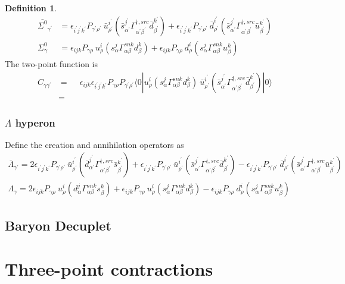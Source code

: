 \documentclass[prd,12pt,superscriptaddress,tightenlines,nofootinbib]{revtex4}
\def\a{{\alpha}}
\def\b{{\beta}}
\def\g{{\gamma}}
\def\G{{\Gamma}}
\def\ip{{i^\prime}}
\def\jp{{j^\prime}}
\def\kp{{k^\prime}}
\def\ap{{\alpha^\prime}}
\def\bp{{\beta^\prime}}
\def\gp{{\gamma^\prime}}
\def\rp{{\rho^\prime}}
\theoremstyle{plain}
\theoremstyle{definition}
\newtheorem{defn}[thm]{Definition}
\theoremstyle{remark}
\begin{document}
\begin{defn}
\begin{align}
	\bar{\Sigma^0}_{\gp} &= \epsilon_{\ip\jp\kp} P_{\gp\rp}\ \bar{u}^\ip_\rp (\bar{s}^{\jp}_{\ap} \G^{\dagger,src}_{\ap\bp} \bar{d}^\kp_\bp ) 
	+ \epsilon_{\ip\jp\kp} P_{\gp\rp}\ \bar{d}^\ip_\rp (\bar{s}^{\jp}_{\ap} \G^{\dagger,src}_{\ap\bp} \bar{u}^\kp_\bp ) \\
	\Sigma^0_{\g} &= \epsilon_{ijk} P_{\g\rho}\ u^i_\rho (s^j_\a \G^{snk}_{\a\b} d^k_\b ) +  
	\epsilon_{ijk} P_{\g\rho}\ d^i_\rho (s^j_\a \G^{snk}_{\a\b} u^k_\b )
	\end{align}
The two-point function is 
\begin{align}
	C_{\g\gp} &= \phantom{-}\epsilon_{ijk} \epsilon_{\ip\jp\kp} P_{\g\rho} P_{\gp\rp} \langle 0| 
	u^i_\rho (s^j_\a \G^{snk}_{\a\b} d^k_\b ) \ \bar{u}^\ip_\rp (\bar{s}^{\jp}_{\ap} \G^{\dagger,src}_{\ap\bp} \bar{d}^\kp_\bp ) 
	|0\rangle
\nonumber\\ &=
\end{align}

\subsubsection*{$\Lambda$ hyperon}
Define the creation and annihilation operators as
\begin{gather}
	\bar{\Lambda}_{\gp} =  2\epsilon_{\ip\jp\kp} P_{\gp\rp}\ \bar{u}^\ip_\rp (\bar{d}^{\jp}_{\ap} \G^{\dagger,src}_{\ap\bp} \bar{s}^\kp_\bp ) 
	+ \epsilon_{\ip\jp\kp} P_{\gp\rp}\ \bar{u}^\ip_\rp (\bar{s}^{\jp}_{\ap} \G^{\dagger,src}_{\ap\bp} \bar{d}^\kp_\bp ) -
	\epsilon_{\ip\jp\kp} P_{\gp\rp}\ \bar{d}^\ip_\rp (\bar{s}^{\jp}_{\ap} \G^{\dagger,src}_{\ap\bp} \bar{u}^\kp_\bp ) 
	\\
	\Lambda_{\g} = 2\epsilon_{ijk} P_{\g\rho}\ u^i_\rho (d^j_\a \G^{snk}_{\a\b} s^k_\b ) +  \epsilon_{ijk} P_{\g\rho}\ u^i_\rho (s^j_\a \G^{snk}_{\a\b} d^k_\b ) - 
	\epsilon_{ijk} P_{\g\rho}\ d^i_\rho (s^j_\a \G^{snk}_{\a\b} u^k_\b ) 
\end{gather}


	







\subsection*{Baryon Decuplet}


\section{Three-point contractions}


\end{defn}
\end{document}

